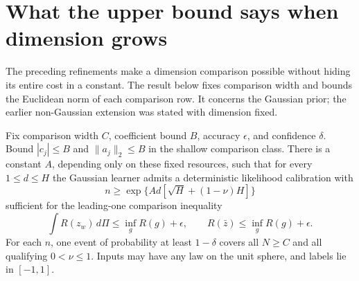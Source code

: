 \section{What the upper bound says when dimension grows}
\label{sec:dimension-oracle}
The preceding refinements make a dimension comparison possible without
hiding its entire cost in a constant. The result below fixes comparison
width and bounds the Euclidean norm of each comparison row. It concerns
the Gaussian prior; the earlier non-Gaussian extension was stated with
dimension fixed.

\begin{corollary}
\label{cor:dimension-shallow-oracle}
Fix comparison width $C$, coefficient bound $B$, accuracy $\epsilon$,
and confidence $\delta$. Bound $|c_j|\le B$ and $\|a_j\|_2\le B$
in the shallow comparison class. There is a constant $A$, depending
only on these fixed resources, such that for every $1\le d\le H$ the
Gaussian learner admits a deterministic likelihood calibration with
\[
 n\ge\exp\{A d[\sqrt H+(1-\nu)H]\}
\]
sufficient for the leading-one comparison inequality
\[
 \int R(z_w)\,d\Pi\le\inf_gR(g)+\epsilon,
 \qquad R(\bar z)\le\inf_gR(g)+\epsilon.
\]
For each $n$, one event of probability at least $1-\delta$ covers all
$N\ge C$ and all qualifying $0<\nu\le1$. Inputs may have any law on
the unit sphere, and labels lie in $[-1,1]$.
\end{corollary}
